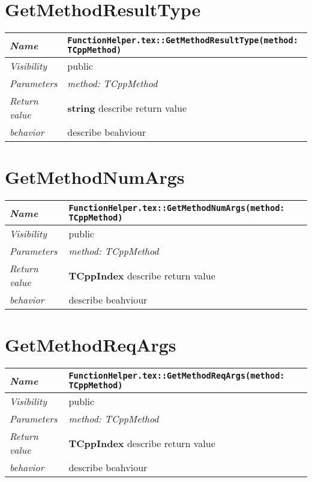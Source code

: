  \section{GetMethodResultType}
\begin{longtable}{p{3cm} @{\hskip 1cm} p{12cm}}
 \hline
\textit{Name} & \texttt{FunctionHelper.tex::GetMethodResultType(method: TCppMethod)}\\
\hline
 \textit{Visibility} & public\\
\hline
\textit{Parameters} & \textit{method: TCppMethod}\\
\hline
\textit{Return value} & \textbf{ string} describe return value\\
  \hline
 \textit{behavior} & describe beahviour \\
\hline
\end{longtable} \pagebreak
 \section{GetMethodNumArgs}
\begin{longtable}{p{3cm} @{\hskip 1cm} p{12cm}}
 \hline
\textit{Name} & \texttt{FunctionHelper.tex::GetMethodNumArgs(method: TCppMethod)}\\
\hline
 \textit{Visibility} & public\\
\hline
\textit{Parameters} & \textit{method: TCppMethod}\\
\hline
\textit{Return value} & \textbf{ TCppIndex} describe return value\\
  \hline
 \textit{behavior} & describe beahviour \\
\hline
\end{longtable} \pagebreak
 \section{GetMethodReqArgs}
\begin{longtable}{p{3cm} @{\hskip 1cm} p{12cm}}
 \hline
\textit{Name} & \texttt{FunctionHelper.tex::GetMethodReqArgs(method: TCppMethod)}\\
\hline
 \textit{Visibility} & public\\
\hline
\textit{Parameters} & \textit{method: TCppMethod}\\
\hline
\textit{Return value} & \textbf{ TCppIndex} describe return value\\
  \hline
 \textit{behavior} & describe beahviour \\
\hline
\end{longtable} \pagebreak
